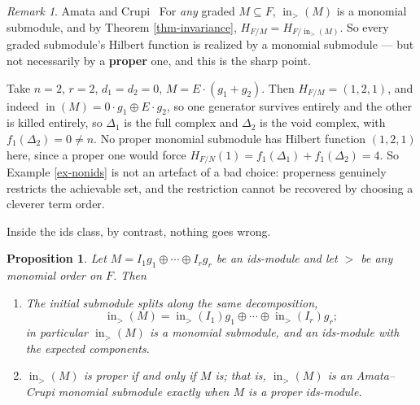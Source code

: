 \documentclass[11pt, a4paper, abstract=yes]{scrartcl}
\theoremstyle{definition}
\theoremstyle{remark}
\newtheorem{remark}[definition]{Remark}
\theoremstyle{plain}
\newtheorem{proposition}[definition]{Proposition}
\newcommand{\inn}{\operatorname{in}}
\begin{document}
\begin{remark}
Amata and Crupi~\cite{AmataCrupi2020KK,AmataCrupi2020} For \emph{any} graded \(M\subseteq F\), \(\inn_>(M)\) is a monomial
submodule, and by Theorem \ref{thm-invariance}, \(H_{F/M}=H_{F/\inn_>(M)}\). So every graded submodule's
Hilbert function is realized by a monomial submodule --- but not necessarily by a \textbf{proper} one, and
this is the sharp point.

Take \(n=2\), \(r=2\), \(d_1=d_2=0\), \(M=E\cdot(g_1+g_2)\). Then \(H_{F/M}=(1,2,1)\), and indeed
\(\inn(M)=0\cdot g_1\oplus E\cdot g_2\), so one generator survives entirely and the other is killed
entirely, so \(\Delta_1\) is the full complex and \(\Delta_2\) is the void complex, with
\(f_1(\Delta_2)=0\ne n\). No proper monomial submodule has Hilbert function \((1,2,1)\) here, since a
proper one would force \(H_{F/N}(1)=f_1(\Delta_1)+f_1(\Delta_2)=4\). So Example \ref{ex-nonids} is not an
artefact of a bad choice: properness genuinely restricts the achievable set, and the restriction
cannot be recovered by choosing a cleverer term order.
\label{rem-ac-reduction}
\end{remark}

Inside the ids class, by contrast, nothing goes wrong.

\begin{proposition}
Let \(M=I_1g_1\oplus\cdots\oplus I_rg_r\) be an ids-module and let \(>\) be \emph{any} monomial order on
\(F\). Then
\begin{enumerate}
\item The initial submodule splits along the same decomposition,
\[
     \inn_>(M)=\inn_>(I_1)g_1\oplus\cdots\oplus\inn_>(I_r)g_r ;
   \]
in particular \(\inn_>(M)\) is a monomial submodule, and an ids-module with the expected
components.
\item \(\inn_>(M)\) is proper if and only if \(M\) is; that is, \(\inn_>(M)\) is an Amata--Crupi
monomial submodule exactly when \(M\) is a proper ids-module.
\end{enumerate}
\label{prop-in-ids}
\end{proposition}
\end{document}
